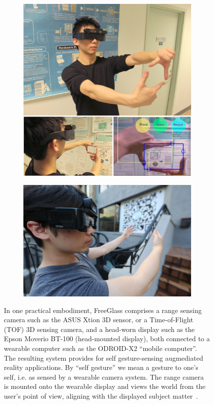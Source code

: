 \begin{figure}
\begin{subfigure}[b]{\columnwidth}
\centering
\includegraphics[width=0.6\columnwidth]{ch5/figs/crop_sample.jpg}
\end{subfigure}
\begin{subfigure}[b]{\columnwidth}
\centering
\vspace{.032in}
\includegraphics[width=0.6\columnwidth]{ch5/figs/wearable/low_res/qr_eyeglass_IMG_2092.jpg}
\end{subfigure}
\caption{In one practical embodiment, FreeGlass comprises a range sensing camera such
as the ASUS Xtion 3D sensor, or a Time-of-Flight (TOF) 3D sensing camera,
and a head-worn display such as the Epson Moverio BT-100 (head-mounted display),
both connected to a wearable computer such as the
ODROID-X2 ``mobile computer''.
The resulting system provides for self gesture-sensing
augmediated reality applications.
By ``self gesture'' we mean a gesture to one's self, i.e. as sensed by
a wearable camera system.
The range camera is mounted onto the wearable display and views the world from
the user's point of view, aligning with the displayed subject matter~\cite{lo2013augmediated}.}
\end{figure}

